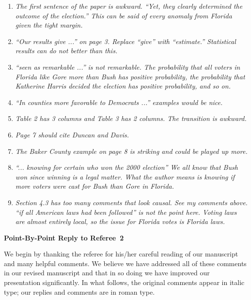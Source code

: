 \documentclass[11pt]{article}
\begin{document}
\bigskip
{}

\begin{enumerate}
\item {\it The first sentence of the paper is awkward.  ``Yet, they
    clearly determined the outcome of the election.'' This can be said
    of every anomaly from Florida given the tight margin.}
  
\item {\it ``Our results give ...'' on page 3.  Replace ``give'' with
    ``estimate.'' Statistical results can do not better than this.}
  
\item {\it ``seen as remarkable ...'' is not remarkable.  The
    probability that all voters in Florida like Gore more than Bush
    has positive probability, the probability that Katherine Harris
    decided the election has positive probability, and so on.}
  
\item {\it ``In counties more favorable to Democrats ...'' examples
    would be nice.}
  
\item {\it Table 2 has 3 columns and Table 3 has 2 columns.  The
    transition is awkward.}
  
\item {\it Page 7 should cite Duncan and Davis.}
  
\item {\it The Baker County example on page 8 is striking and could be
    played up more.}
  
\item {\it ``... knowing for certain who won the 2000 election'' We
    all know that Bush won since winning is a legal matter.  What the
    author means is knowing if more voters were cast for Bush than
    Gore in Florida.}
  
\item {\it Section 4.3 has too many comments that look causal.  See my
    comments above.  ``if all American laws had been followed'' is not
    the point here.  Voting laws are almost entirely local, so the
    issue for Florida votes is Florida laws.}


\end{enumerate}

\clearpage
\begin{center}
  {\bf \Large Point-By-Point Reply to Referee~2}
\end{center}

We begin by thanking the referee for his/her careful reading of our
manuscript and many helpful comments. We believe we have addressed all
of these comments in our revised manuscript and that in so doing we
have improved our presentation significantly.  In what follows, the
original comments appear in italic type; our replies and comments are
in roman type.

\bigskip

\end{document}
